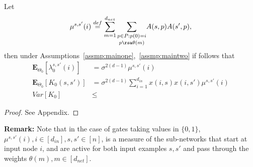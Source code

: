 \begin{theorem}\label{th:dgnexp}
Let 
\begin{align*}
\mu^{s,s'}(i)\stackrel{def}=\sum_{m=1}^{d_{net}} \underset{p\rsa\theta(m)}{\sum_{p\in P: p(0)=i}}A(s,p) A(s',p),
\end{align*} then under Assumptions~\ref{assmp:mainone},~\ref{assmp:maintwo} if follows that
 \begin{align*}
 \mathbf{E}_{\Theta_0}\left[\lambda^{s,s'}_0(i)\right]&=\sigma^{2(d-1)}\mu^{s,s'}(i)\\
\mathbf{E}_{\Theta_0}\left[K_0(s,s')\right]&=\sigma^{2(d-1)}\sum_{i=1}^{d_{in}}x(i,s) x(i,s')\mu^{s,s'}(i)\\
Var\left[K_0\right]&\leq 
\end{align*}

\end{theorem}
\begin{proof}
See Appendix.
\end{proof}
\textbf{Remark:} Note that in the case of gates taking values in $\{0,1\}$, $\mu^{s,s'}(i), i\in [d_{in}], s,s'\in [n]$, is a measure of the sub-networks that start at input node $i$, and are active for both input examples $s,s'$ and pass through the weights $\theta(m), m\in[d_{net}]$. 

